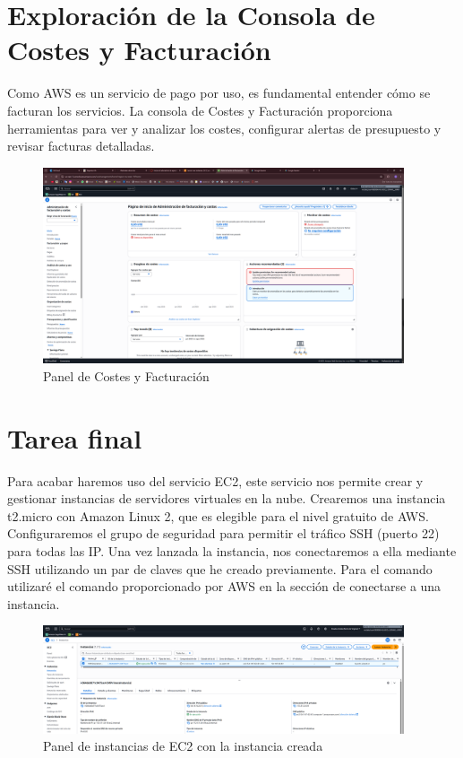 \documentclass{article}
\begin{document}
	\section{Exploración de la Consola de Costes y Facturación}

	Como AWS es un servicio de pago por uso, es fundamental entender cómo se facturan los servicios. La consola de Costes y Facturación proporciona herramientas para ver y analizar los costes, configurar alertas de presupuesto y revisar facturas detalladas.

	\begin{figure}[h!]
	\centering
	\includegraphics[width=0.95\textwidth]{tarea_8.png}
	\caption{Panel de Costes y Facturación}
	\end{figure}
	
	\clearpage

	\section{Tarea final}

	Para acabar haremos uso del servicio EC2, este servicio nos permite crear y gestionar instancias de servidores virtuales en la nube. Crearemos una instancia t2.micro con Amazon Linux 2, que es elegible para el nivel gratuito de AWS. Configuraremos el grupo de seguridad para permitir el tráfico SSH (puerto 22) para todas las IP. Una vez lanzada la instancia, nos conectaremos a ella mediante SSH utilizando un par de claves que he creado previamente. Para el comando utilizaré el comando proporcionado por AWS en la sección de conectarse a una instancia.


	\begin{figure}[H]
	\centering
	\includegraphics[width=0.95\textwidth]{tarea_final_1.png}
	\caption{Panel de instancias de EC2 con la instancia creada}
	\end{figure}
\end{document}
